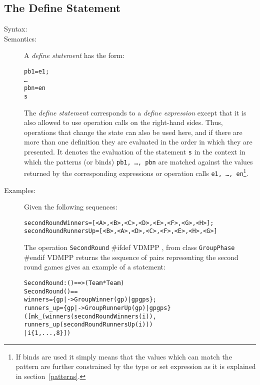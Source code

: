 \documentclass[\pformat,12pt]{article}
\begin{document}
\subsection{The Define Statement}\label{defstmt}

\begin{description}
\item[Syntax:]



\item[Semantics:] A {\it define statement} has the form:
  \begin{alltt}
     pb1 = e1;
        \ldots
        pbn = en
      s
  \end{alltt}
  The {\it define statement} corresponds to a {\it define expression}
  except that it is also allowed to use operation calls on the right-hand
  sides. Thus, operations that change the state can also be used here, and
  if there are more than one definition they are evaluated in the order in
  which they are presented.  It denotes the evaluation of the statement
  {\tt s} in the context in which the patterns (or binds) {\tt pb1, \ldots,
    pbn} are matched against the values returned by the corresponding
  expressions or operation calls {\tt e1, \ldots, en}\footnote{If binds are
    used it simply means that the values which can match the pattern are
    further constrained by the type or set expression as it is explained in
    section~\ref{patterns}.}.

\item[Examples:] Given the following sequences:
  \begin{alltt}
  secondRoundWinners = [<A>,<B>,<C>,<D>,<E>,<F>,<G>,<H>];
  secondRoundRunnersUp = [<B>,<A>,<D>,<C>,<F>,<E>,<H>,<G>]
  \end{alltt}
  The operation \texttt{SecondRound}%
#ifdef VDMPP
, from class \texttt{GroupPhase}
#endif VDMPP
  returns the sequence of pairs 
  representing the second round games gives an example of a  
  statement:
  \begin{alltt}
  SecondRound : () ==>  (Team * Team)
  SecondRound () ==
   winners = \{ gp |-> GroupWinner(gp) | gp  gps \};
     runners_up = \{ gp |-> GroupRunnerUp(gp) | gp  gps\}
   ([mk_(winners(secondRoundWinners(i)),
                runners_up(secondRoundRunnersUp(i))) 
           | i  \{1,...,8\}])
  \end{alltt}

\end{description}
\end{document}

